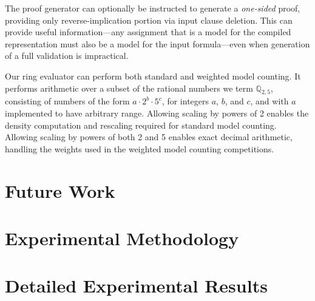\documentclass[letterpaper,USenglish,cleveref, autoref, thm-restate]{lipics-v2021}
\newcommand{\pand}{\mathbin{\land^{\sf p}}}
\newcommand{\dependencyset}{{\cal D}}
\newcommand{\drational}{\mathbb{Q}_{2,5}}
\newcommand{\modelset}{{\cal M}}
\newcommand{\makenode}[1]{\mathbf{#1}}
\newcommand{\nodeu}{\makenode{u}}
\begin{document}
The proof generator can optionally be instructed to generate a {\em
  one-sided} proof, providing only reverse-implication portion via
input clause deletion.  This can provide useful information---any
assignment that is a model for the compiled representation
must also be a model for the input formula---even when generation of a
full validation is impractical.

Our ring evaluator can perform both standard and weighted model
counting.  It performs arithmetic over a subset of the rational
numbers we term $\drational$, consisting of numbers of the form
$a \cdot 2^{b} \cdot 5^{c}$, for integers $a$, $b$, and $c$, and
with $a$ implemented to have arbitrary range.
Allowing scaling by powers of 2 enables the density computation
and rescaling required for standard model counting.  Allowing scaling
by powers of both 2 and 5 enables exact decimal arithmetic, handling
the weights used in the weighted model counting competitions.


\section{Future Work}
\label{sect:future}






\appendix

\section{Experimental Methodology}

\section{Detailed Experimental Results}
\end{document}
